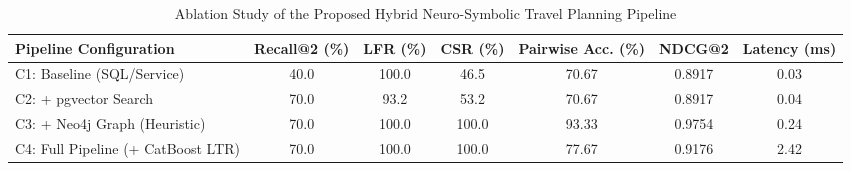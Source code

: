 \begin{table}[htbp]
\centering
\caption{Ablation Study of the Proposed Hybrid Neuro-Symbolic Travel Planning Pipeline}
\label{tab:ablation_results}
\begin{tabular}{lcccccc}
\hline
\textbf{Pipeline Configuration} & \textbf{Recall@2 (\%)} & \textbf{LFR (\%)} & \textbf{CSR (\%)} & \textbf{Pairwise Acc. (\%)} & \textbf{NDCG@2} & \textbf{Latency (ms)} \\
\hline
C1: Baseline (SQL/Service) & 40.0 & 100.0 & 46.5 & 70.67 & 0.8917 & 0.03 \\
C2: + pgvector Search & 70.0 & 93.2 & 53.2 & 70.67 & 0.8917 & 0.04 \\
C3: + Neo4j Graph (Heuristic) & 70.0 & 100.0 & 100.0 & 93.33 & 0.9754 & 0.24 \\
C4: Full Pipeline (+ CatBoost LTR) & 70.0 & 100.0 & 100.0 & 77.67 & 0.9176 & 2.42 \\
\hline
\end{tabular}
\end{table}